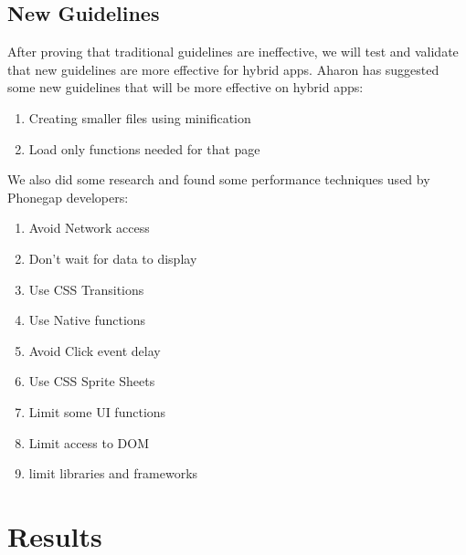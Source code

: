 \documentclass{acm_proc_article-sp}
\begin{document}
\subsection{New Guidelines}
After proving that traditional guidelines are ineffective, we will test and validate that new guidelines are more effective for hybrid apps.
Aharon has suggested some new guidelines that will be more effective on hybrid apps:
\vspace{-1.0em}
\begin{enumerate}\itemsep1pt \parskip0pt 
	\item Creating smaller files using minification
	\item Load only functions needed for that page
\end{enumerate}
We also did some research and found some performance techniques used by Phonegap developers:
\vspace{-1.0em}
\begin{enumerate}\itemsep1pt \parskip0pt 
	\item Avoid Network access
	\item Don't wait for data to display
	\item Use CSS Transitions
	\item Use Native functions
	\item Avoid Click event delay
	\item Use CSS Sprite Sheets
	\item Limit some UI functions
	\item Limit access to DOM
	\item limit libraries and frameworks
\end{enumerate}
\section{Results}
\end{document}
